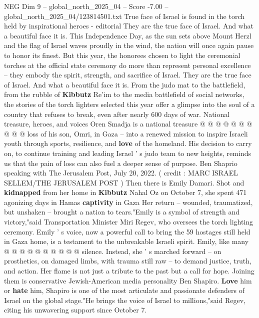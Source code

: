\begin{textsample}{NEG Dim 9 – global\_north\_2025\_04 – Score -7.00 – global\_north\_2025\_04/123814501.txt}  \label{ex:f9_neg_125}
True face of Israel is found in the torch held by inspirational heroes - editorial They are the true face of Israel.
And what a beautiful face it is.
This Independence Day, as the sun sets above Mount Herzl and the flag of Israel waves proudly in the wind, the nation will once again pause to honor its finest.
But this year, the honorees chosen to light the ceremonial torches at the official state ceremony do more than represent personal excellence -- they embody the spirit, strength, and sacrifice of Israel.
They are the true face of Israel.
And what a beautiful face it is.
From the judo mat to the battlefield, from the rubble of \textbf{Kibbutz} Re'im to the media battlefield of social networks, the stories of the torch lighters selected this year offer a glimpse into the soul of a country that refuses to break, even after nearly 600 days of war.
National treasure, heroes, and voices Oren Smadja is a national treasure @ @ @ @ @ @ @ @ @ @ loss of his son, Omri, in Gaza -- into a renewed mission to inspire Israeli youth through sports, resilience, and \textbf{love} of the homeland.
His decision to carry on, to continue training and leading Israel ' s judo team to new heights, reminds us that the pain of loss can also fuel a deeper sense of purpose.
Ben Shaprio speaking with The Jerusalem Post, July 20, 2022. ( credit : MARC ISRAEL SELLEM/THE JERUSALEM POST ) Then there is Emily Damari.
Shot and \textbf{kidnapped} from her home in \textbf{Kibbutz} Nahal Oz on October 7, she spent 471 agonizing days in Hamas \textbf{captivity} in Gaza Her return -- wounded, traumatized, but unshaken -- brought a nation to tears."Emily is a symbol of strength and victory,"said Transportation Minister Miri Regev, who oversees the torch lighting ceremony.
Emily ' s voice, now a powerful call to bring the 59 hostages still held in Gaza home, is a testament to the unbreakable Israeli spirit.
Emily, like many @ @ @ @ @ @ @ @ @ @ silence.
Instead, she ' s marched forward -- on prosthetics, on damaged limbs, with trauma still raw -- to demand justice, truth, and action.
Her flame is not just a tribute to the past but a call for hope.
Joining them is conservative Jewish-American media personality Ben Shapiro. \textbf{Love} him or \textbf{hate} him, Shapiro is one of the most articulate and passionate defenders of Israel on the global stage."He brings the voice of Israel to millions,"said Regev, citing his unwavering support since October 7.

\end{textsample}
